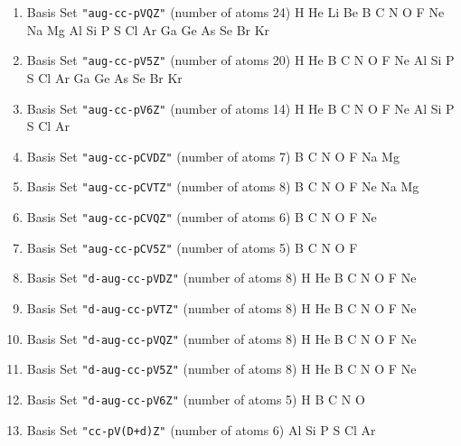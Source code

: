 \begin{enumerate}
\item Basis Set \verb#"aug-cc-pVQZ"# (number of atoms 24)  \newline
  H He Li Be B C N O F Ne Na Mg Al Si P S Cl Ar Ga Ge As Se Br Kr


\item Basis Set \verb#"aug-cc-pV5Z"# (number of atoms 20)  \newline
  H He B C N O F Ne Al Si P S Cl Ar Ga Ge As Se Br Kr


\item Basis Set \verb#"aug-cc-pV6Z"# (number of atoms 14)  \newline
  H He B C N O F Ne Al Si P S Cl Ar


\item Basis Set \verb#"aug-cc-pCVDZ"# (number of atoms 7)  \newline
  B C N O F Na Mg


\item Basis Set \verb#"aug-cc-pCVTZ"# (number of atoms 8)  \newline
  B C N O F Ne Na Mg

\item Basis Set \verb#"aug-cc-pCVQZ"# (number of atoms 6)  \newline
  B C N O F Ne


\item Basis Set \verb#"aug-cc-pCV5Z"# (number of atoms 5)  \newline
  B C N O F


\item Basis Set \verb#"d-aug-cc-pVDZ"# (number of atoms 8)  \newline
  H He B C N O F Ne


\item Basis Set \verb#"d-aug-cc-pVTZ"# (number of atoms 8)  \newline
  H He B C N O F Ne


\item Basis Set \verb#"d-aug-cc-pVQZ"# (number of atoms 8)  \newline
  H He B C N O F Ne


\item Basis Set \verb#"d-aug-cc-pV5Z"# (number of atoms 8)  \newline
  H He B C N O F Ne


\item Basis Set \verb#"d-aug-cc-pV6Z"# (number of atoms 5)  \newline
  H B C N O


\item Basis Set \verb#"cc-pV(D+d)Z"# (number of atoms 6)  \newline
  Al Si P S Cl Ar



\end{enumerate}
